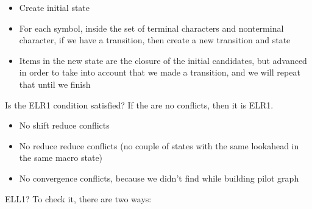 			\begin{itemize}
				\item Create initial state
				\item For each symbol, inside the set of terminal characters and nonterminal character, if we have a transition, then create a new transition and state
				\item Items in the new state are the closure of the initial candidates, but advanced in order to take into account that we made a transition, and we will repeat that until we finish
			\end{itemize}
			Is the ELR1 condition satisfied? If the are no conflicts, then it is ELR1.
			\begin{itemize}
				\item No shift reduce conflicts
				\item No reduce reduce conflicts (no couple of states with the same lookahead in the same macro state)
				\item No convergence conflicts, because we didn't find while building pilot graph
			\end{itemize}
			ELL1? To check it, there are two ways:
